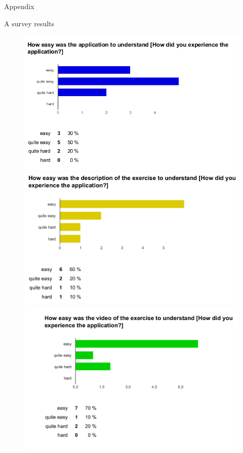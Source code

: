 \begin{LARGE}
Appendix\\
\end{LARGE}
A survey results
\begin{figure}[b!]
  \centering
    \begin{minipage}{0.7\textwidth}
      \centering
        \includegraphics[width=1\textwidth]{00_resources/figures/survey_results1.png}
    \end{minipage}
    \begin{minipage}{0.7\textwidth}
      \centering
        \includegraphics[width=1\textwidth]{00_resources/figures/survey_results2.png}
    \end{minipage}
    \begin{minipage}{0.7\textwidth}
      \centering
        \includegraphics[width=1\textwidth]{00_resources/figures/survey_results3.png}

\end{minipage}
\end{figure}
